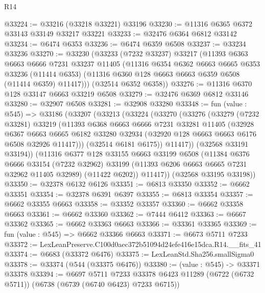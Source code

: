 \begin{lexlean}{R14}
\begin{coremodule}
@33224 := @33216 (@33218 @33221) @33196
@33230 := @11316 @6365 @6372 @33143 @33149 @33217 @33221
@33233 := @32476 @6364 @6812 @33142
@33234 := @6474 @6353
@33236 := @6474 @6359 @6508
@33237 := @33234 @33236
@33270 := @33230
    (@33233
      (@7232 @33237)
      @33217
      (@11393
        @6363
        @6663
        @6666
        @7231
        @33237
        @11405
        (@11316
          @6354
          @6362
          @6663
          @6665
          @6353
          @33236
          (@11414 @6353)
          (@11316 @6360 @128 @6663 @6663 @6359 @6508 (@11414 @6359) @11417)))
      (@32514 @6352 @6358))
@33276 := @11316 @6370 @128 @33147 @6663 @33219 @6508
@33279 := @32476 @6369 @6812 @33146
@33280 := @32907 @6508
@33281 := @32908 @33280
@33348 := fun (value : @545) =>
  @33186
    (@33207
      (@33213
        (@33224
          (@33270
            (@33276
              (@33279
                (@7232 @33281)
                @33219
                (@11393
                  @6368
                  @6663
                  @6666
                  @7231
                  @33281
                  @11405
                  (@32928
                    @6367
                    @6663
                    @6665
                    @6182
                    @33280
                    @32934
                    (@32920 @128 @6663 @6663 @6176 @6508 @32926 @11417)))
                (@32514 @6181 @6175))
              @11417))
          (@32568 @33191 @33194))
        (@11316
          @6377
          @128
          @33155
          @6663
          @33199
          @6508
          (@11384
            @6376
            @6666
            @33154
            (@7232 @32962)
            @33199
            (@11393 @6206 @6663 @6665 @7231 @32962 @11405 @32989)
            (@11422 @6202))
          @11417))
      (@32568 @33195 @33198))
@33350 := @32378 @6132 @6126
@33351 := @6813 @33350
@33352 := @6662 @33351
@33354 := @32378 @6391 @6397
@33355 := @6813 @33354
@33357 := @6662 @33355 @6663
@33358 := @33352 @33357
@33360 := @6662 @33358 @6663
@33361 := @6662 @33360
@33362 := @7444 @6412
@33363 := @6667 @33362
@33365 := @6662 @33363 @6663
@33366 := @33361 @33365
@33369 := fun (value : @545) => @6662 @33366 @6663
@33371 := @6673 @5711 @7233
@33372 := LexLeanPreserve.C100d0aec372b51094d24efe416e15dca.R14.__fits_41
@33374 := @6683 (@33372 @6476)
@33375 := LexLeanStd.Sha256.smallSigma0
@33378 := @33374 (@544 (@33375 @6476))
@33380 := (value : @545) -> @33371 @33378
@33394 := @6697
    @5711
    @7233
    @33378
    @6423
    @11289
    (@6722 (@6732 @5711))
    (@6738 (@6739 (@6740 @6423) @7233 @6715))

\end{coremodule}
\end{lexlean}
